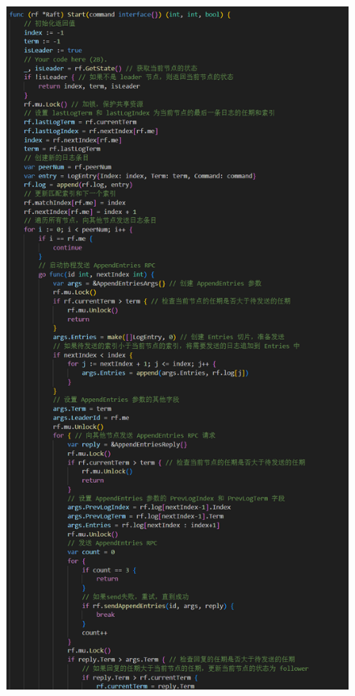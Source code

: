 \documentclass[]{article}
\begin{document}
\begin{itemize}
\begin{figure}[H]
			\includegraphics[height=1\textheight]{./2B/Start1.png}
		\end{figure}
		\begin{figure}[H]
			\centering

\end{figure}
\end{itemize}
\end{document}
